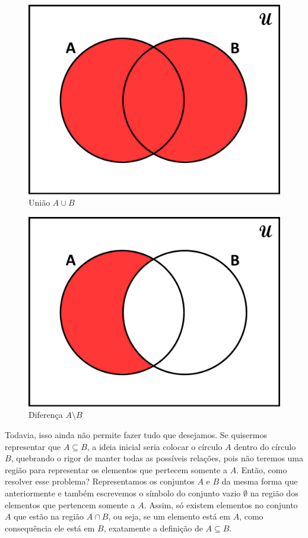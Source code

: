 \begin{figure}[h!]
  \centering
  \includegraphics[scale=0.29]{figures/sets/fig_sets_03_06.pdf}
  \caption{União $A \cup B$}
  \label{fig:sets_03_06}
\end{figure}

\begin{figure}[ht!]
  \centering
  \includegraphics[scale=0.3]{figures/sets/fig_sets_03_07.pdf}
  \caption{Diferença $A \setminus B$}
  \label{fig:sets_03_07}
\end{figure}

\FloatBarrier

Todavia, isso ainda não permite fazer tudo que desejamos. Se quisermos representar que $A \subseteq B$, a ideia inicial seria colocar o círculo $A$ dentro do círculo $B$, quebrando o rigor de manter todas as possíveis relações, pois não teremos uma região para representar os elementos que pertecem somente a $A$. Então, como resolver esse problema? Representamos os conjuntos $A$ e $B$ da mesma forma que anteriormente e também escrevemos o símbolo do conjunto vazio $\emptyset$ na região dos elementos que pertencem somente a $A$. Assim, só existem elementos no conjunto $A$ que estão na região $A\cap B$, ou seja, se um elemento está em $A$, como consequência ele está em $B$, exatamente a definição de $A \subseteq B$.

